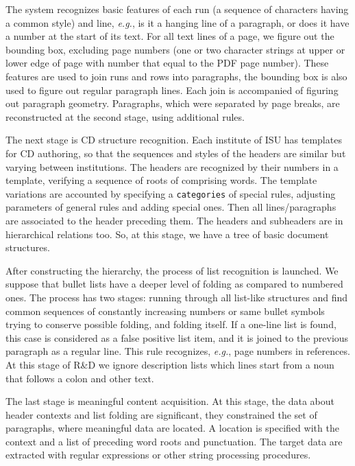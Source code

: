 \documentclass[
]{aiitart}
\begin{document}
The system recognizes basic features of each run (a sequence of characters having a common style) and line, \emph{e.g.}, is it a hanging line of a paragraph, or does it have a number at the start of its text.  For all text lines of a page, we figure out the bounding box, excluding page numbers (one or two character strings at upper or lower edge of page with number that equal to the PDF page number). These features are used to join runs and rows into paragraphs, the bounding box is also used to figure out regular paragraph lines.  Each join is accompanied of figuring out paragraph geometry. Paragraphs, which were separated by page breaks, are reconstructed at the second stage, using additional rules.

The next stage is CD structure recognition.  Each institute of ISU has templates for CD authoring, so that the sequences and styles of the headers are similar but varying between institutions.  The headers are recognized by their numbers in a template, verifying a sequence of roots of comprising words.  The template variations are accounted by specifying a \verb|categories| of special rules, adjusting parameters of general rules and adding special ones.  Then all lines/paragraphs are associated to the header preceding them.  The headers and subheaders are in hierarchical relations too.  So, at this stage, we have a tree of basic document structures.

After constructing the hierarchy, the process of list recognition is launched.  We suppose that bullet lists have a deeper level of folding as compared to numbered ones.  The process has two stages: running through all list-like structures and find common sequences of constantly increasing numbers or same bullet symbols trying to conserve possible folding, and folding itself.  If a one-line list is found, this case is considered as a false positive list item, and it is joined to the previous paragraph as a regular line.  This rule recognizes, \emph{e.g.}, page numbers in references.  At this stage of R\&D we ignore description lists which lines start from a noun that follows a colon and other text.

The last stage is meaningful content acquisition.  At this stage, the data about header contexts and list folding are significant, they constrained the set of paragraphs, where meaningful data are located.  A location is specified with the context and a list of preceding word roots and punctuation. The target data are extracted with regular expressions or other string processing procedures.
\end{document}
